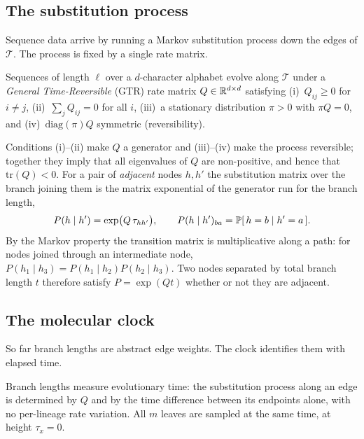 \subsection{The substitution process}\label{sec:model-gtr}

Sequence data arrive by running a Markov substitution process down the edges of
$\mathcal{T}$. The process is fixed by a single rate matrix.

\begin{assumption}\label{asm:gtr}
Sequences of length $\ell$ over a $d$-character alphabet evolve along $\mathcal{T}$
under a \emph{General Time-Reversible} (GTR) rate matrix $Q \in \mathbb{R}^{d \times d}$
satisfying (i)~$Q_{ij}\ge0$ for $i\ne j$, (ii)~$\sum_j Q_{ij}=0$ for all $i$,
(iii)~a stationary distribution $\pi>0$ with $\pi Q=0$, and (iv)~$\mathrm{diag}(\pi)Q$
symmetric (reversibility).
\end{assumption}

\noindent Conditions (i)--(ii) make $Q$ a generator and (iii)--(iv) make the process
reversible; together they imply that all eigenvalues of $Q$ are non-positive, and
hence that $\mathrm{tr}(Q)<0$. For a pair of \emph{adjacent} nodes $h,h'$ the
substitution matrix over the branch joining them is the matrix exponential of the
generator run for the branch length,
\begin{equation}\label{eq:transition_matrix}
   P(h \mid h') = \exp\bigl(Q\,\tau_{hh'}\bigr),
   \qquad
   P(h \mid h')_{ba} = \mathbb{P}[\,h = b \mid h' = a\,].
\end{equation}
By the Markov property the transition matrix is multiplicative along a path: for
nodes joined through an intermediate node, $P(h_1 \mid h_3) = P(h_1 \mid h_2)
P(h_2 \mid h_3)$. Two nodes separated by total branch length $t$ therefore satisfy
$P = \exp(Qt)$ whether or not they are adjacent.

\subsection{The molecular clock}\label{sec:model-clock}

So far branch lengths are abstract edge weights. The clock identifies them with
elapsed time.

\begin{assumption}\label{asm:clock}
Branch lengths measure evolutionary time: the substitution process along an edge is
determined by $Q$ and by the time difference between its endpoints alone, with no
per-lineage rate variation. All $m$ leaves are sampled at the same time, at height
$\tau_{x} = 0$.
\end{assumption}

